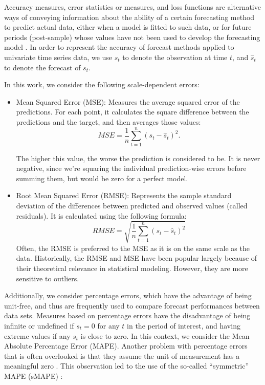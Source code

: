 Accuracy measures, error statistics or measures, and loss functions are alternative ways of conveying information about the ability of a certain forecasting method to predict actual data, either when a model is fitted to such data, or for future periods (post-sample) whose values have not been used to develop the forecasting model \cite{Makridakis1993}. In order to represent the accuracy of forecast methods applied to univariate time series data, we use $s_{t}$ to denote the observation at time $t$, and $\hat{s}_t$ to denote the forecast of $s_{t}$.

In this work, we consider the following scale-dependent errors:
\begin{itemize}
	\item Mean Squared Error (MSE): Measures the average squared error of the predictions. For each point, it calculates the square difference between the predictions and the target, and then averages those values:
	\begin{equation}
	MSE = \frac{1}{n} \sum_{t=1}^{n} \left(s_t - \hat{s}_t\right)^{2}.
	\end{equation}
	
	The higher this value, the worse the prediction is considered to be. It is never negative, since we're squaring the individual prediction-wise errors before summing them, but would be zero for a perfect model.
	
	\item Root Mean Squared Error (RMSE): Represents the sample standard deviation of the differences between predicted and observed values (called residuals). It is calculated using the following formula:
	\begin{equation}
	RMSE = \sqrt{\frac{1}{n} \sum_{t=1}^{n} \left(s_t - \hat{s}_t\right)^2}
	\end{equation}
	Often, the RMSE is preferred to the MSE as it is on the same scale as the data. Historically, the RMSE and MSE have been popular largely because of their theoretical relevance in statistical modeling. However, they are more sensitive to outliers.
\end{itemize}

Additionally, we consider percentage errors, which have the advantage of being unit-free, and thus are frequently used to compare forecast performances between data sets. Measures based on percentage errors have the disadvantage of being infinite or undefined if $s_{t}=0$ for any $t$ in the period of interest, and having extreme values if any $s_{t}$ is close to zero. In this context, we consider the Mean Absolute Percentage Error (MAPE). Another problem with percentage errors that is often overlooked is that they assume the unit of measurement has a meaningful zero \cite{Hyndman2006}. This observation led to the use of the so-called ``symmetric'' MAPE (sMAPE) \cite{Makridakis1993}:

